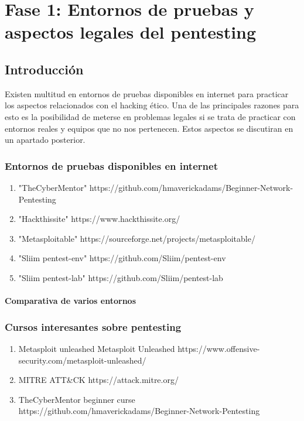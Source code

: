 \chapter{Fase 1: Entornos de pruebas y aspectos legales del pentesting}
\section{Introducción}

Existen multitud en entornos de pruebas disponibles en internet para practicar los aspectos relacionados con el hacking ético. Una de las principales razones para esto es la posibilidad de meterse en problemas legales si se trata de practicar con entornos reales y equipos que no nos pertenecen. Estos aspectos se discutiran en un apartado posterior.


\subsection{Entornos de pruebas disponibles en internet}

\begin{enumerate}
    \item "TheCyberMentor" https://github.com/hmaverickadams/Beginner-Network-Pentesting
    \item "Hackthissite" https://www.hackthissite.org/
    \item "Metasploitable" https://sourceforge.net/projects/metasploitable/
    \item "Sliim pentest-env" https://github.com/Sliim/pentest-env
    \item "Sliim pentest-lab" https://github.com/Sliim/pentest-lab
\end{enumerate}
\subsubsection{Comparativa de varios entornos}
\subsection{Cursos interesantes sobre pentesting}
\begin{enumerate}
    \item Metasploit unleashed Metasploit Unleashed https://www.offensive-security.com/metasploit-unleashed/
    \item MITRE ATT\&CK https://attack.mitre.org/
    \item TheCyberMentor beginner curse https://github.com/hmaverickadams/Beginner-Network-Pentesting
\end{enumerate}


